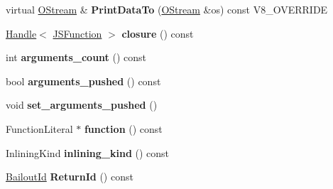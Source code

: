 \begin{DoxyCompactItemize}
\item 
\hypertarget{classv8_1_1internal_1_1_v8___f_i_n_a_l_ac450dad970b14246be761ccf5004924b}{}virtual \hyperlink{classv8_1_1internal_1_1_o_stream}{O\+Stream} \& {\bfseries Print\+Data\+To} (\hyperlink{classv8_1_1internal_1_1_o_stream}{O\+Stream} \&os) const V8\+\_\+\+O\+V\+E\+R\+R\+I\+D\+E\label{classv8_1_1internal_1_1_v8___f_i_n_a_l_ac450dad970b14246be761ccf5004924b}

\item 
\hypertarget{classv8_1_1internal_1_1_v8___f_i_n_a_l_ade63ed30b870bf27f384fe16a3aad9fa}{}\hyperlink{classv8_1_1internal_1_1_handle}{Handle}$<$ \hyperlink{classv8_1_1internal_1_1_j_s_function}{J\+S\+Function} $>$ {\bfseries closure} () const \label{classv8_1_1internal_1_1_v8___f_i_n_a_l_ade63ed30b870bf27f384fe16a3aad9fa}

\item 
\hypertarget{classv8_1_1internal_1_1_v8___f_i_n_a_l_a692779c6a2d1c9498d2c9efeb023ab16}{}int {\bfseries arguments\+\_\+count} () const \label{classv8_1_1internal_1_1_v8___f_i_n_a_l_a692779c6a2d1c9498d2c9efeb023ab16}

\item 
\hypertarget{classv8_1_1internal_1_1_v8___f_i_n_a_l_a1c072e1c674b8e9b87e132fcff7ae231}{}bool {\bfseries arguments\+\_\+pushed} () const \label{classv8_1_1internal_1_1_v8___f_i_n_a_l_a1c072e1c674b8e9b87e132fcff7ae231}

\item 
\hypertarget{classv8_1_1internal_1_1_v8___f_i_n_a_l_ac7d7c89d547d27c55d58567a31326a75}{}void {\bfseries set\+\_\+arguments\+\_\+pushed} ()\label{classv8_1_1internal_1_1_v8___f_i_n_a_l_ac7d7c89d547d27c55d58567a31326a75}

\item 
\hypertarget{classv8_1_1internal_1_1_v8___f_i_n_a_l_ac21710f3a6916877bd53a74299346adb}{}Function\+Literal $\ast$ {\bfseries function} () const \label{classv8_1_1internal_1_1_v8___f_i_n_a_l_ac21710f3a6916877bd53a74299346adb}

\item 
\hypertarget{classv8_1_1internal_1_1_v8___f_i_n_a_l_a6fdfb7a4f568097a2ca6c16776bd71bf}{}Inlining\+Kind {\bfseries inlining\+\_\+kind} () const \label{classv8_1_1internal_1_1_v8___f_i_n_a_l_a6fdfb7a4f568097a2ca6c16776bd71bf}

\item 
\hypertarget{classv8_1_1internal_1_1_v8___f_i_n_a_l_a2c7f2293c16baf5e7d5921269f45a96c}{}\hyperlink{classv8_1_1internal_1_1_bailout_id}{Bailout\+Id} {\bfseries Return\+Id} () const \label{classv8_1_1internal_1_1_v8___f_i_n_a_l_a2c7f2293c16baf5e7d5921269f45a96c}


\end{DoxyCompactItemize}
